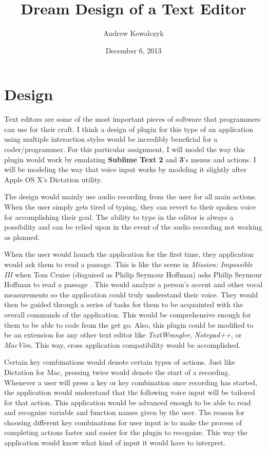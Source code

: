 \documentclass[11pt, oneside]{article}
\title{Dream Design of a Text Editor}
\author{Andrew Kowalczyk}
\date{December 6, 2013}
\begin{document}
\maketitle

\section{Design}

Text editors are some of the most important pieces of software that programmers can use for their craft. I think a design of plugin for this type of an application using multiple interaction styles would be incredibly beneficial for a coder/programmer. For this particular assignment, I will model the way this plugin would work by emulating \textbf{Sublime Text 2} and \textbf{3}'s menus and actions. I will be modeling the way that voice input works by modeling it slightly after Apple OS X's Dictation utility. 

The design would mainly use audio recording from the user for all main actions. When the user simply gets tired of typing, they can revert to their spoken voice for accomplishing their goal. The ability to type in the editor is always a possibility and can be relied upon in the event of the audio recording not working as planned.

When the user would launch the application for the first time, they application would ask them to read a passage. This is like the scene in \textit{Mission: Impossible III} when Tom Cruise (disguised as Philip Seymour Hoffman) asks Philip Seymour Hoffman to read a passage \cite{mission-impossible}. This would analyze a person's accent and other vocal measurements so the application could truly understand their voice. They would then be guided through a series of tasks for them to be acquainted with the overall commands of the application. This would be comprehensive enough for them to be able to code from the get go. Also, this plugin could be modified to be an extension for any other text editor like \textit{TextWrangler}, \textit{Notepad++}, or \textit{MacVim}. This way, cross application compatibility would be accomplished. 

Certain key combinations would denote certain types of actions. Just like Dictation for Mac, pressing  twice would denote the start of a recording. Whenever a user will press a key or key combination once recording has started, the application would understand that the following voice input will be tailored for that action. This application would be advanced enough to be able to read and recognize variable and function names given by the user. The reason for choosing different key combinations for user input is to make the process of completing actions faster and easier for the plugin to recognize. This way the application would know what kind of input it would have to interpret.
\end{document}
